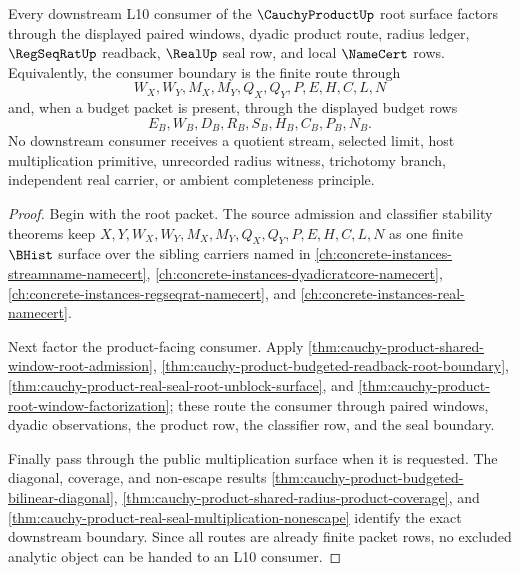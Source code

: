 \begin{theorem}
\label{thm:cauchy-product-root-phase-handoff}
Every downstream L10 consumer of the $\CauchyProductUp$ root surface factors through the displayed paired windows, dyadic product route, radius ledger, $\RegSeqRatUp$ readback, $\RealUp$ seal row, and local $\NameCert$ rows. Equivalently, the consumer boundary is the finite route through
$$
W_X,W_Y,M_X,M_Y,Q_X,Q_Y,P,E,H,C,L,N
$$
and, when a budget packet is present, through the displayed budget rows
$$
E_B,W_B,D_B,R_B,S_B,H_B,C_B,P_B,N_B.
$$
No downstream consumer receives a quotient stream, selected limit, host multiplication primitive, unrecorded radius witness, trichotomy branch, independent real carrier, or ambient completeness principle.
\end{theorem}
\begin{proof}
Begin with the root packet. The source admission and classifier stability theorems keep $X,Y,W_X,W_Y,M_X,M_Y,Q_X,Q_Y,P,E,H,C,L,N$ as one finite $\BHist$ surface over the sibling carriers named in \autoref{ch:concrete-instances-streamname-namecert}, \autoref{ch:concrete-instances-dyadicratcore-namecert}, \autoref{ch:concrete-instances-regseqrat-namecert}, and \autoref{ch:concrete-instances-real-namecert}.

Next factor the product-facing consumer. Apply \autoref{thm:cauchy-product-shared-window-root-admission}, \autoref{thm:cauchy-product-budgeted-readback-root-boundary}, \autoref{thm:cauchy-product-real-seal-root-unblock-surface}, and \autoref{thm:cauchy-product-root-window-factorization}; these route the consumer through paired windows, dyadic observations, the product row, the classifier row, and the seal boundary.

Finally pass through the public multiplication surface when it is requested. The diagonal, coverage, and non-escape results \autoref{thm:cauchy-product-budgeted-bilinear-diagonal}, \autoref{thm:cauchy-product-shared-radius-product-coverage}, and \autoref{thm:cauchy-product-real-seal-multiplication-nonescape} identify the exact downstream boundary. Since all routes are already finite packet rows, no excluded analytic object can be handed to an L10 consumer.
\end{proof}


